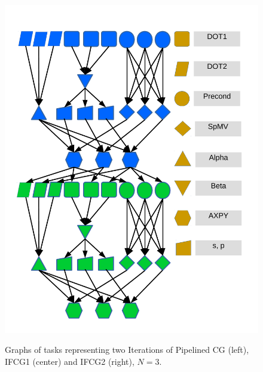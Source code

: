 \begin{figure}[bhtp]
{                \includegraphics[scale=0.30]{ifcg/figs/charts/ifcg2.pdf}
        }
        \vspace{-0.6cm}
        \caption{Graphs of tasks representing two Iterations of Pipelined CG (left), IFCG1 (center) and IFCG2 (right), $N=3$.}
        \label{tdg}
\end{figure}


